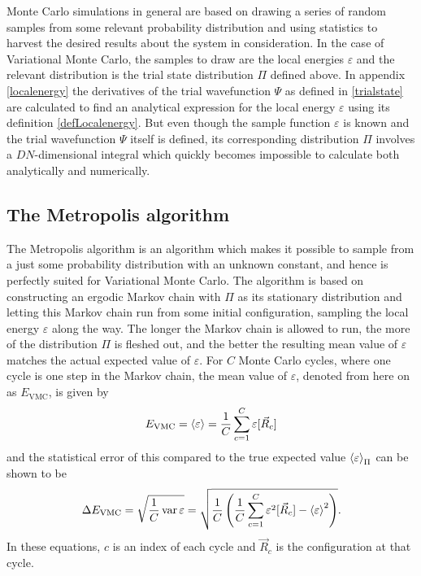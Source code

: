 \documentclass[a4paper,8pt]{article}
\DeclareMathOperator{\variance}{var}
\begin{document}
\begin{multicols}{2}
Monte Carlo simulations in general are based on drawing a series of random samples from some relevant probability distribution and using statistics to harvest the desired results about the system in consideration. In the case of Variational Monte Carlo, the samples to draw are the local energies $\varepsilon$ and the relevant distribution is the trial state distribution $\Pi$ defined above. In appendix \ref{localenergy} the derivatives of the trial wavefunction $\Psi$ as defined in \eqref{trialstate} are calculated to find an analytical expression for the local energy $\varepsilon$ using its definition \eqref{defLocalenergy}. But even though the sample function $\varepsilon$ is known and the trial wavefunction $\Psi$ itself is defined, its corresponding distribution $\Pi$ involves a $DN$-dimensional integral which quickly becomes impossible to calculate both analytically and numerically.


\subsection{The Metropolis algorithm} \label{Metropolis}
The Metropolis algorithm is an algorithm which makes it possible to sample from a just some probability distribution with an unknown constant, and hence is perfectly suited for Variational Monte Carlo. The algorithm is based on constructing an ergodic Markov chain with $\Pi$ as its stationary distribution and letting this Markov chain run from some initial configuration, sampling the local energy $\varepsilon$ along the way. The longer the Markov chain is allowed to run, the more of the distribution $\Pi$ is fleshed out, and the better the resulting mean value of $\varepsilon$ matches the actual expected value of $\varepsilon$. For $C$ Monte Carlo cycles, where one cycle is one step in the Markov chain, the mean value of $\varepsilon$, denoted from here on as $E_\text{VMC}$, is given by
\begin{equation}
E_\text{VMC} = \ev{\varepsilon} = \frac{1}{C}\sum\limits_{c = 1}^C \varepsilon[\vec{R}_c]
\end{equation}
and the statistical error of this compared to the true expected value $\ev{\varepsilon}_\Pi$ can be shown to be
\begin{equation} 
\Delta E_\text{VMC} = \sqrt{\frac{1}{C} \variance\varepsilon} = \sqrt{\frac{1}{C}\left(\frac{1}{C}\sum\limits_{c = 1}^C \varepsilon^2[\vec{R}_c] - \ev{\varepsilon}^2\right)}.
\end{equation}
In these equations, $c$ is an index of each cycle and $\vec{R}_c$ is the configuration at that cycle.


\end{multicols}
\end{document}
